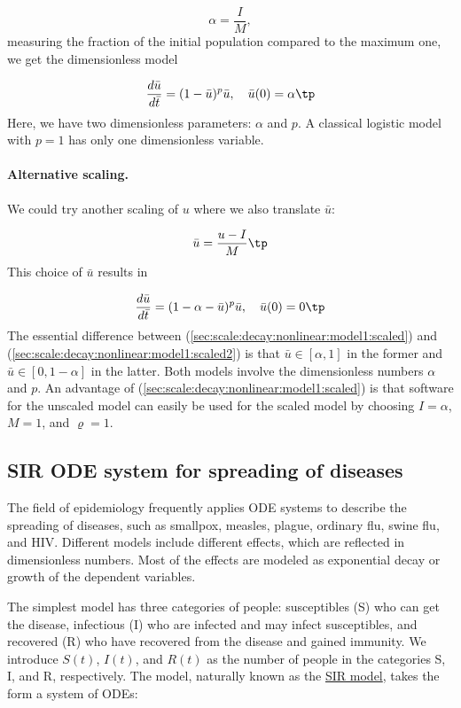 \documentclass[graybox,envcountchap,sectrefs,final]{svmonodo}
\begin{document}
\[ \alpha = \frac{I}{M},\]
measuring the fraction of the initial population compared to the maximum
one, we get the dimensionless model

\begin{equation}
\frac{d\bar u}{d\bar t} = (1 - \bar u)^p \bar u,\quad
\bar u(0) =\alpha\tp
\label{sec:scale:decay:nonlinear:model1:scaled}
\end{equation}
Here, we have two dimensionless parameters: $\alpha$ and $p$. A classical
logistic model with $p=1$ has only one dimensionless variable.

\paragraph{Alternative scaling.}
We could try another scaling of $u$ where we also translate $\bar u$:

\[ \bar u = \frac{u-I}{M}\tp \]
This choice of $\bar u$ results in

\begin{equation}
\frac{d\bar u}{d\bar t} = (1 - \alpha - \bar u)^p \bar u,\quad
\bar u(0) =0\tp
\label{sec:scale:decay:nonlinear:model1:scaled2}
\end{equation}
The essential difference between (\ref{sec:scale:decay:nonlinear:model1:scaled})
and (\ref{sec:scale:decay:nonlinear:model1:scaled2}) is that
$\bar u\in [\alpha, 1]$ in the former and $\bar u \in [0, 1-\alpha]$ in
the latter. Both models involve the dimensionless numbers $\alpha$ and $p$.
An advantage of (\ref{sec:scale:decay:nonlinear:model1:scaled})
is that software for the unscaled model can easily be used for the
scaled model by choosing $I=\alpha$, $M=1$, and $\varrho=1$.

\subsection{SIR ODE system for spreading of diseases}

The field of epidemiology frequently applies ODE systems to describe
the spreading of diseases, such as smallpox, measles, plague, ordinary
flu, swine flu, and HIV. Different models include different effects,
which are reflected in dimensionless numbers. Most of the effects are
modeled as exponential decay or growth of the dependent variables.

The simplest model has three categories of people: susceptibles (S)
who can get the disease, infectious (I) who are infected and may
infect susceptibles, and recovered (R) who have recovered from the
disease and gained immunity. We introduce $S(t)$, $I(t)$, and $R(t)$
as the number of people in the categories S, I, and R, respectively.
The model, naturally known as the \href{{https://en.wikipedia.org/wiki/Epidemic_model}}{SIR model}, takes the form a
system of ODEs:
\end{document}
